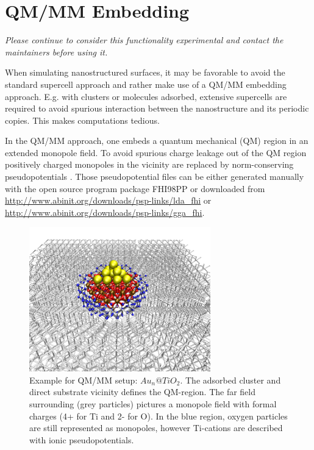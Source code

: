 \section{QM/MM Embedding}

\emph{Please continue to consider this functionality
  experimental and contact the maintainers before using it.}

When simulating nanostructured surfaces, it may be favorable to 
avoid the standard supercell approach and rather make use of a QM/MM
embedding approach. E.g. with clusters or molecules adsorbed, extensive 
supercells are required to avoid spurious interaction between the 
nanostructure and its periodic copies. This makes computations tedious.

In the QM/MM approach, one embeds a quantum mechanical (QM) region in an extended 
monopole field. To avoid spurious charge leakage out of the QM region positively 
charged monopoles in the vicinity are replaced by norm-conserving pseudopotentials
\cite{KleinmanBylander}. Those pseudopotential files can be either generated manually with 
the open source program package FHI98PP \cite{FuchsFHI98PP} or downloaded from \url{http://www.abinit.org/downloads/psp-links/lda_fhi} or
\url{http://www.abinit.org/downloads/psp-links/gga_fhi}. 

\begin{figure}[hb]
  \centering
  \includegraphics[width=0.7\textwidth]{qmmm}
  \caption{Example for QM/MM setup: $Au_n@TiO_2$. The adsorbed cluster and direct substrate vicinity defines the QM-region.
The far field surrounding (grey particles) pictures a monopole field with formal charges (4+ for Ti and 2- for O). In the blue 
region, oxygen particles are still represented as monopoles, however Ti-cations are described with ionic pseudopotentials.}
  \label{fig:qmmm_embedding}
\end{figure}

